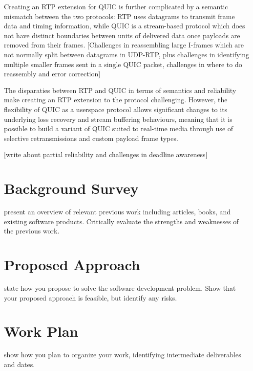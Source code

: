 \documentclass{mprop}
\begin{document}
Creating an RTP extension for QUIC is further complicated by a semantic mismatch between the two protocols: RTP uses datagrams to transmit frame data and timing information, while QUIC is a stream-based protocol which does not have distinct boundaries between units of delivered data once payloads are removed from their frames. [Challenges in reassembling large I-frames which are not normally split between datagrams in UDP-RTP, plus challenges in identifying multiple smaller frames sent in a single QUIC packet, challenges in where to do reassembly and error correction]

The disparaties between RTP and QUIC in terms of semantics and reliability make creating an RTP extension to the protocol challenging. However, the flexibility of QUIC as a userspace protocol allows significant changes to its underlying loss recovery and stream buffering behaviours, meaning that it is possible to build a variant of QUIC suited to real-time media through use of selective retransmissions and custom payload frame types. 

[write about partial reliability and challenges in deadline awareness]

\newpage

\section{Background Survey}

present an overview of relevant previous work including articles, books, and existing software products. Critically evaluate the strengths and weaknesses of the previous work.

\newpage

\section{Proposed Approach}

state how you propose to solve the software development problem. Show that your proposed approach is feasible, but identify any risks.

\newpage

\section{Work Plan}

show how you plan to organize your work, identifying intermediate deliverables and dates.

\newpage



\end{document}
